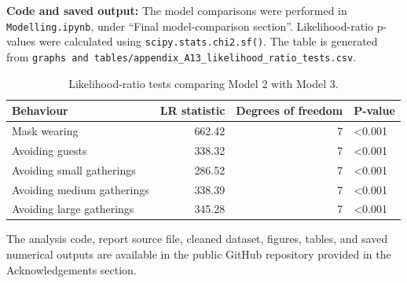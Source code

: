 \documentclass[
  12pt,
  a4paper,
]{article}
\begin{document}
\textbf{Code and saved output:} The model comparisons were performed in
\texttt{Modelling.ipynb}, under ``Final model-comparison section''.
Likelihood-ratio p-values were calculated using \texttt{scipy.stats.chi2.sf()}.
The table is generated from
\texttt{graphs\ and\ tables/appendix\_A13\_likelihood\_ratio\_tests.csv}.

\begin{longtable}[t]{lrrl}
\caption{\label{tab:lr-tests-appendix}Likelihood-ratio tests comparing Model 2 with Model 3.}\\
\toprule
Behaviour & LR statistic & Degrees of freedom & P-value\\
\midrule
Mask wearing & 662.42 & 7 & <0.001\\
Avoiding guests & 338.32 & 7 & <0.001\\
Avoiding small gatherings & 286.52 & 7 & <0.001\\
Avoiding medium gatherings & 338.39 & 7 & <0.001\\
Avoiding large gatherings & 345.28 & 7 & <0.001\\
\bottomrule
\end{longtable}

\clearpage

The analysis code, report source file, cleaned dataset, figures, tables,
and saved numerical outputs are available in the public GitHub
repository provided in the Acknowledgements section.

\normalsize
\end{document}
